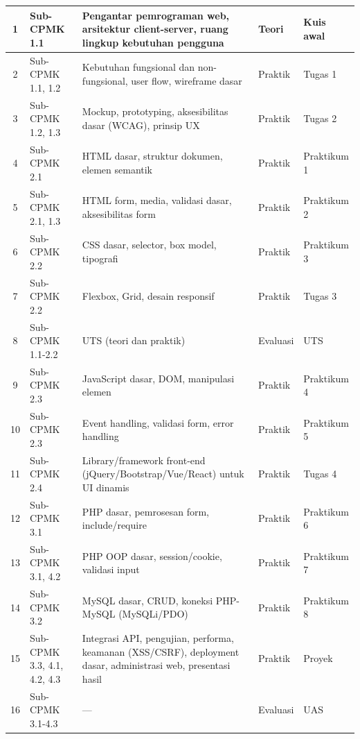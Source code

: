 \documentclass[12pt,a4paper]{article}
\begin{document}
\begin{longtable}{|c|>{\raggedright\arraybackslash}p{3cm}|>{\raggedright\arraybackslash}p{6.2cm}|>{\raggedright\arraybackslash}p{2.2cm}|>{\raggedright\arraybackslash}p{2.2cm}|}
1 & Sub-CPMK 1.1 & Pengantar pemrograman web, arsitektur client-server, ruang lingkup kebutuhan pengguna & Teori & Kuis awal \\
\hline
2 & Sub-CPMK 1.1, 1.2 & Kebutuhan fungsional dan non-fungsional, user flow, wireframe dasar & Praktik & Tugas 1 \\
\hline
3 & Sub-CPMK 1.2, 1.3 & Mockup, prototyping, aksesibilitas dasar (WCAG), prinsip UX & Praktik & Tugas 2 \\
\hline
4 & Sub-CPMK 2.1 & HTML dasar, struktur dokumen, elemen semantik & Praktik & Praktikum 1 \\
\hline
5 & Sub-CPMK 2.1, 1.3 & HTML form, media, validasi dasar, aksesibilitas form & Praktik & Praktikum 2 \\
\hline
6 & Sub-CPMK 2.2 & CSS dasar, selector, box model, tipografi & Praktik & Praktikum 3 \\
\hline
7 & Sub-CPMK 2.2 & Flexbox, Grid, desain responsif & Praktik & Tugas 3 \\
\hline
8 & Sub-CPMK 1.1-2.2 & UTS (teori dan praktik) & Evaluasi & UTS \\
\hline
9 & Sub-CPMK 2.3 & JavaScript dasar, DOM, manipulasi elemen & Praktik & Praktikum 4 \\
\hline
10 & Sub-CPMK 2.3 & Event handling, validasi form, error handling & Praktik & Praktikum 5 \\
\hline
11 & Sub-CPMK 2.4 & Library/framework front-end (jQuery/Bootstrap/Vue/React) untuk UI dinamis & Praktik & Tugas 4 \\
\hline
12 & Sub-CPMK 3.1 & PHP dasar, pemrosesan form, include/require & Praktik & Praktikum 6 \\
\hline
13 & Sub-CPMK 3.1, 4.2 & PHP OOP dasar, session/cookie, validasi input & Praktik & Praktikum 7 \\
\hline
14 & Sub-CPMK 3.2 & MySQL dasar, CRUD, koneksi PHP-MySQL (MySQLi/PDO) & Praktik & Praktikum 8 \\
\hline
15 & Sub-CPMK 3.3, 4.1, 4.2, 4.3 & Integrasi API, pengujian, performa, keamanan (XSS/CSRF), deployment dasar, administrasi web, presentasi hasil & Praktik & Proyek \\
\hline
16 & Sub-CPMK 3.1-4.3 & --- & Evaluasi & UAS \\
\hline
\end{longtable}

\vspace{0.5cm}

\end{document}
